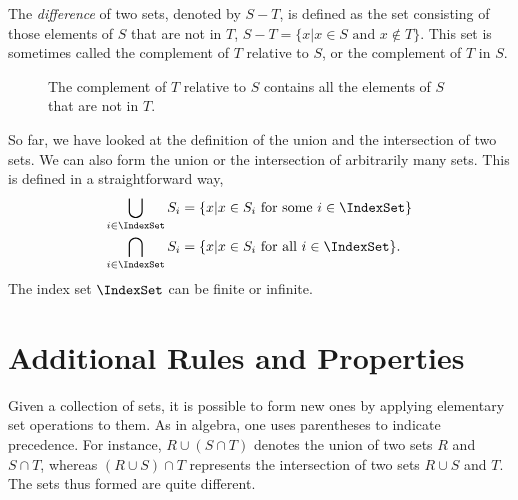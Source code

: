 The \emph{difference} of two sets, denoted by $S - T$, is defined as the set consisting of those elements of $S$ that are not in $T$, $S - T = \{ x | x \in S \text{ and } x \notin T \}$.
This set is sometimes called the complement of $T$ relative to $S$, or the complement of $T$ in $S$.

\begin{figure}[htb]
\begin{center}
\caption{The complement of $T$ relative to $S$ contains all the elements of $S$ that are not in $T$.}
\end{center}
\end{figure}

So far, we have looked at the definition of the union and the intersection of two sets.
We can also form the union or the intersection of arbitrarily many sets.
This is defined in a straightforward way,
\begin{align*}
\bigcup_{i \in \IndexSet} S_{i}
&= \{ x | x \in S_{i} \text{ for some } i \in \IndexSet \} \\
\bigcap_{i \in \IndexSet} S_{i}
&= \{ x | x \in S_{i} \text{ for all } i \in \IndexSet \} .
\end{align*}
The index set $\IndexSet$ can be finite or infinite.


\section{Additional Rules and Properties}

Given a collection of sets, it is possible to form new ones by applying elementary set operations to them.
As in algebra, one uses parentheses to indicate precedence.
For instance, $R \cup (S \cap T)$ denotes the union of two sets $R$ and $S \cap T$, whereas $(R \cup S) \cap T$ represents the intersection of two sets $R \cup S$ and $T$.
The sets thus formed are quite different.

